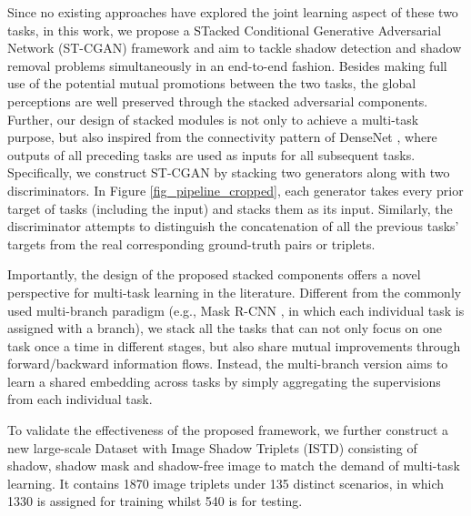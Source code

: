 \documentclass[10pt,twocolumn,letterpaper]{article}
\begin{document}
Since no existing approaches have explored the joint learning aspect of these two tasks, in this work, we propose a STacked Conditional Generative Adversarial Network (ST-CGAN) framework and aim to tackle shadow detection and shadow removal problems simultaneously in an end-to-end fashion. Besides making full use of the potential mutual promotions between the two tasks, the global perceptions are well preserved through the stacked adversarial components. Further, our design of stacked modules is not only to achieve a multi-task purpose, but also inspired from the connectivity pattern of DenseNet \cite{huang2016densely}, where outputs of all preceding tasks are used as inputs for all subsequent tasks. Specifically, we construct ST-CGAN by stacking two generators along with two discriminators. In Figure \ref{fig_pipeline_cropped}, each generator takes every prior target of tasks (including the input) and stacks them as its input. Similarly, the discriminator attempts to distinguish the concatenation of all the previous tasks' targets from the real corresponding ground-truth pairs or triplets.


Importantly, the design of the proposed stacked components offers a novel perspective for multi-task learning in the literature. Different from the commonly used multi-branch paradigm (e.g., Mask R-CNN \cite{he2017mask}, in which each individual task is assigned with a branch), we stack all the tasks that can not only focus on one task once a time in different stages, but also share mutual improvements through forward/backward information flows. Instead, the multi-branch version aims to learn a shared embedding across tasks by simply aggregating the supervisions from each individual task. 


To validate the effectiveness of the proposed framework, we further construct a new large-scale Dataset with Image Shadow Triplets (ISTD) consisting of shadow, shadow mask and shadow-free image to match the demand of multi-task learning. It contains 1870 image triplets under 135 distinct scenarios, in which 1330 is assigned for training whilst 540 is for testing.
\end{document}
